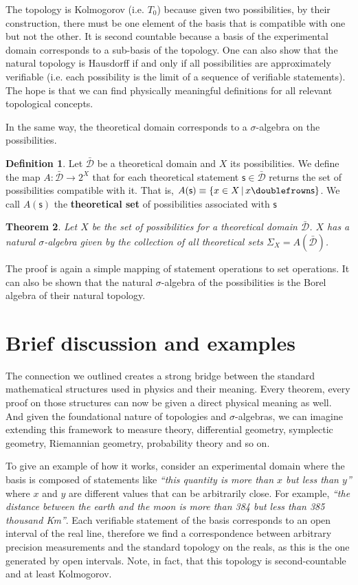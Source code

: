\documentclass[letterpaper]{article}
\theoremstyle{plain}%
\newtheorem{thrm}{Theorem}[section]
\theoremstyle{definition}
\newtheorem{defn}[thrm]{Definition}
\theoremstyle{remark}
\numberwithin{equation}{section}
\def\comp{\doublefrown}
\newcommand{\stmt}[1][s] {\mathsf{#1}}
\newcommand{\tdomain}[1][D] {\bar{\mathcal{#1}}}
\newcommand{\statement}[1] {\emph{``#1''}}
\begin{document}
The topology is Kolmogorov (i.e. $T_0$) because given two possibilities, by their construction, there must be one element of the basis that is compatible with one but not the other. It is second countable because a basis of the experimental domain corresponds to a sub-basis of the topology. One can also show that the natural topology is Hausdorff if and only if all possibilities are approximately verifiable (i.e. each possibility is the limit of a sequence of verifiable statements). The hope is that we can find physically meaningful definitions for all relevant topological concepts.

In the same way, the theoretical domain corresponds to a $\sigma$-algebra on the possibilities.

\begin{defn}
	Let $\tdomain$ be a theoretical domain and $X$ its possibilities. We define the map $A : \tdomain \rightarrow 2^X$ that for each theoretical statement $\stmt \in \tdomain$ returns the set of possibilities compatible with it. That is, $A(\stmt)\equiv\{ x \in X \, | \, x \comp \stmt\}$. We call $A(\stmt)$ the \textbf{theoretical set} of possibilities associated with $\stmt$
\end{defn}

\begin{thrm}
	Let $X$ be the set of possibilities for a theoretical domain $\tdomain$. $X$ has a natural $\sigma$-algebra given by the collection of all theoretical sets $\Sigma_X=A(\tdomain)$.
\end{thrm}

The proof is again a simple mapping of statement operations to set operations. It can also be shown that the natural $\sigma$-algebra of the possibilities is the Borel algebra of their natural topology.

\section{Brief discussion and examples}

The connection we outlined creates a strong bridge between the standard mathematical structures used in physics and their meaning. Every theorem, every proof on those structures can now be given a direct physical meaning as well. And given the foundational nature of topologies and $\sigma$-algebras, we can imagine extending this framework to measure theory, differential geometry, symplectic geometry, Riemannian geometry, probability theory and so on.

To give an example of how it works, consider an experimental domain where the basis is composed of statements like \statement{this quantity is more than $x$ but less than $y$} where $x$ and $y$ are different values that can be arbitrarily close. For example, \statement{the distance between the earth and the moon is more than 384 but less than 385 thousand Km}. Each verifiable statement of the basis corresponds to an open interval of the real line, therefore we find a correspondence between arbitrary precision measurements and the standard topology on the reals, as this is the one generated by open intervals. Note, in fact, that this topology is second-countable and at least Kolmogorov.
\end{document}
